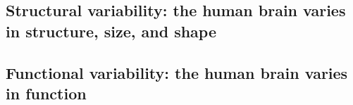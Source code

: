 \subsection{Structural variability: the human brain varies in structure, size, and shape}
\subsection{Functional variability: the human brain varies in function}

  










